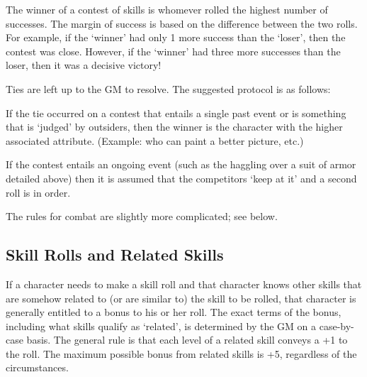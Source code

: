 \documentclass[twoside]{book}
\begin{document}
  
    {  
    The winner of a contest of skills is whomever rolled
               the highest number of successes. The margin of success is
               based on the difference between the two rolls. For
               example, if the `winner' had only 1 more
               success than the `loser', then the contest was
               close. However, if the `winner' had three more
               successes than the loser, then it was a decisive victory!
               
    }
  
    {  
    Ties are left up to the GM to resolve. The suggested
               protocol is as follows: 
    }
  
    {  
    If the tie occurred on a contest that entails a
               single past event or is something that is
               `judged' by outsiders, then the winner is the
               character with the higher associated attribute. (Example:
               who can paint a better picture, etc.) 
    }
  
    {  
    If the contest entails an ongoing event (such as the
               haggling over a suit of armor detailed above) then it is
               assumed that the competitors `keep at it' and
               a second roll is in order. 
    }
  
    {  
    The rules for combat are slightly more complicated;
               see below. 
    }
  
    

\subsection{Skill Rolls and Related Skills}
    
    {  
    If a character needs to make a skill roll and that
               character knows other skills that are somehow related to
               (or are similar to) the skill to be rolled, that character
               is generally entitled to a bonus to his or her roll. The
               exact terms of the bonus, including what skills qualify as
               `related', is determined by the GM on a
               case-by-case basis. The general rule is that each level of
               a related skill conveys a +1 to the roll. The maximum
               possible bonus from related skills is +5, regardless of
               the circumstances. 
    }
  
  
\end{document}
